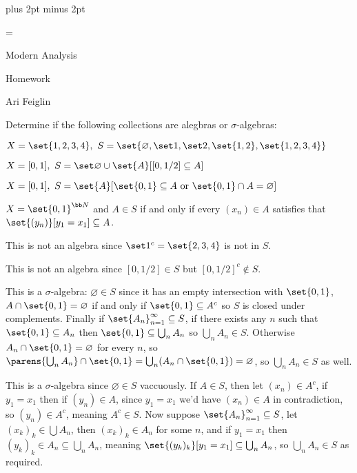 

\parindent=0pt
\parskip=3pt plus 2pt minus 2pt



\footline={}

\setcounter{section}{2}


\def\printmcount{\the\counter{section}.\the\counter{math counter}}

{

    \centerline{Modern Analysis}
    \smallskip
    \centerline{Homework \the{}}
    \centerline{Ari Feiglin}

\eppbox}

\bexerc

    Determine if the following collections are alegbras or $\sigma$-algebras:
    \benum
        \item $X=\set{1,2,3,4},\ S=\set{\varnothing,\set1,\set2,\set{1,2},\set{1,2,3,4}}$
        \item $X=[0,1],\ S=\set\varnothing\cup\set{A}[{[0,1/2]}\subseteq A]$
        \item $X=[0,1],\ S=\set{A}[\set{0,1}\subseteq A\hbox{ or }\set{0,1}\cap A=\varnothing]$
        \item $X=\set{0,1}^{\bb N}$ and $A\in S$ if and only if every $(x_n)\in A$ satisfies that $\set{(y_n)}[y_1=x_1]\subseteq A$.
    \eenum

\eexerc

\benum
    \item This is not an algebra since $\set1^c=\set{2,3,4}$ is not in $S$.
    \item This is not an algebra since $[0,1/2]\in S$ but $[0,1/2]^c\notin S$.
    \item This is a $\sigma$-algebra: $\varnothing\in S$ since it has an empty intersection with $\set{0,1}$, $A\cap\set{0,1}=\varnothing$ if and only if $\set{0,1}\subseteq A^c$ so $S$ is closed under
    complements.
    Finally if $\set{A_n}_{n=1}^\infty\subseteq S$, if there exists any $n$ such that $\set{0,1}\subseteq A_n$ then $\set{0,1}\subseteq\bigcup_nA_n$ so $\bigcup_nA_n\in S$.
    Otherwise $A_n\cap\set{0,1}=\varnothing$ for every $n$, so $\parens{\bigcup_nA_n}\cap\set{0,1}=\bigcup_n(A_n\cap\set{0,1})=\varnothing$, so $\bigcup_nA_n\in S$ as well.
    \item This is a $\sigma$-algebra since $\varnothing\in S$ vaccuously.
    If $A\in S$, then let $(x_n)\in A^c$, if $y_1=x_1$ then if $(y_n)\in A$, since $y_1=x_1$ we'd have $(x_n)\in A$ in contradiction, so $(y_n)\in A^c$, meaning $A^c\in S$.
    Now suppose $\set{A_n}_{n=1}^\infty\subseteq S$, let $(x_k)_k\in\bigcup A_n$, then $(x_k)_k\in A_n$ for some $n$, and if $y_1=x_1$ then $(y_k)_k\in A_n\subseteq\bigcup_nA_n$, meaning
    $\set{(y_k)_k}[y_1=x_1]\subseteq\bigcup_nA_n$, so $\bigcup_nA_n\in S$ as required.
\eenum

